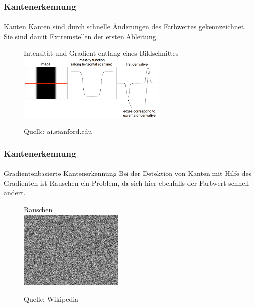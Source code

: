 \documentclass{beamer}
\begin{document}
\begin{frame}
    \frametitle{Kantenerkennung}
\framesubtitle{}
\begin{block}{Kanten}
Kanten sind durch schnelle Änderungen des Farbwertes gekennzeichnet. Sie sind damit Extremstellen der ersten Ableitung.
\end{block}
\begin{figure}[htp]
      \centering
Intensität und Gradient entlang eines Bildschnittes \\
    \includegraphics[width=0.65\textwidth]{images/edgedetection} 
      \caption{Quelle: ai.stanford.edu}
\end{figure}

 \end{frame}

\begin{frame}
    \frametitle{Kantenerkennung}
\framesubtitle{}
\begin{block}{Gradientenbasierte Kantenerkennung}
Bei der Detektion von Kanten mit Hilfe des Gradienten ist   Rauschen ein Problem, da sich  hier ebenfalls  der Farbwert schnell ändert. 
\end{block}
\begin{figure}[htp]
      \centering
Rauschen \\
    \includegraphics[width=0.45\textwidth]{images/noise} 
      \caption{Quelle: Wikipedia}
\end{figure}

 \end{frame}
\end{document}
